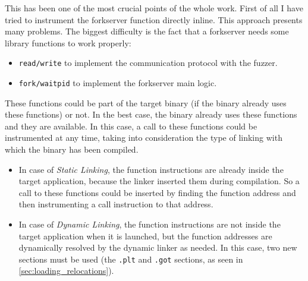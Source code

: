 This has been one of the most crucial points of the whole work.
First of all I have tried to instrument the forkserver function directly inline.
This approach presents many problems. The biggest difficulty is the fact that a forkserver needs some library functions 
to work properly:
\begin{itemize}
    \item \texttt{read/write} to implement the communication protocol with the fuzzer.
    \item \texttt{fork/waitpid} to implement the forkserver main logic.
\end{itemize}
These functions could be part of the target binary (if the binary already uses these functions) or not.
In the best case, the binary already uses these functions and they are available. 
In this case, a call to these functions could be instrumented at any time, taking into consideration the type of 
linking with which the binary has been compiled.
\begin{itemize}
    \item In case of \textit{Static Linking}, the function instructions are already inside the target application, 
        because the linker inserted them during compilation. So a call to these functions could be inserted by finding 
        the function address and then instrumenting a call instruction to that address.
    \item In case of \textit{Dynamic Linking}, the function instructions are not inside the target application when 
        it is launched, but the function addresses are dynamically resolved by the dynamic linker as needed. 
        In this case, two new sections must be used (the \texttt{.plt} and \texttt{.got} sections, as seen in 
        \cref{sec:loading_relocations}).
\end{itemize}

